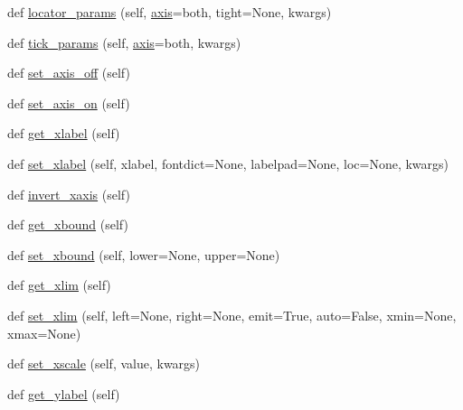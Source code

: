 \begin{DoxyCompactItemize}
\item 
def \hyperlink{classmatplotlib_1_1axes_1_1__base_1_1__AxesBase_ad216bc73e69844202f6ccb94dcd396c4}{locator\+\_\+params} (self, \hyperlink{classmatplotlib_1_1axes_1_1__base_1_1__AxesBase_a9c63db539d7ab6bcb071919bdfd8af8f}{axis}=\textquotesingle{}both\textquotesingle{}, tight=None, kwargs)
\item 
def \hyperlink{classmatplotlib_1_1axes_1_1__base_1_1__AxesBase_abd388619c905b1f2f74c361314de4480}{tick\+\_\+params} (self, \hyperlink{classmatplotlib_1_1axes_1_1__base_1_1__AxesBase_a9c63db539d7ab6bcb071919bdfd8af8f}{axis}=\textquotesingle{}both\textquotesingle{}, kwargs)
\item 
def \hyperlink{classmatplotlib_1_1axes_1_1__base_1_1__AxesBase_a081cde5870b8398fce8f85a81ebc1957}{set\+\_\+axis\+\_\+off} (self)
\item 
def \hyperlink{classmatplotlib_1_1axes_1_1__base_1_1__AxesBase_a11e763320558acf5cbbb8ba96d118df5}{set\+\_\+axis\+\_\+on} (self)
\item 
def \hyperlink{classmatplotlib_1_1axes_1_1__base_1_1__AxesBase_a11ec08f4243947683148112020aa755b}{get\+\_\+xlabel} (self)
\item 
def \hyperlink{classmatplotlib_1_1axes_1_1__base_1_1__AxesBase_ad8536294adfb9b0319ea6245cae56777}{set\+\_\+xlabel} (self, xlabel, fontdict=None, labelpad=None, loc=None, kwargs)
\item 
def \hyperlink{classmatplotlib_1_1axes_1_1__base_1_1__AxesBase_a89ad257422c8025445e6289a5a2caa84}{invert\+\_\+xaxis} (self)
\item 
def \hyperlink{classmatplotlib_1_1axes_1_1__base_1_1__AxesBase_ae663b3092f62003d80a3f852b86fd853}{get\+\_\+xbound} (self)
\item 
def \hyperlink{classmatplotlib_1_1axes_1_1__base_1_1__AxesBase_ab95ea6eb5d87d4662c1fec40a396f08d}{set\+\_\+xbound} (self, lower=None, upper=None)
\item 
def \hyperlink{classmatplotlib_1_1axes_1_1__base_1_1__AxesBase_a6b2af971d2b20a36ac27b7efb5d582ca}{get\+\_\+xlim} (self)
\item 
def \hyperlink{classmatplotlib_1_1axes_1_1__base_1_1__AxesBase_a99a2478a357038988eb69918eddceda5}{set\+\_\+xlim} (self, left=None, right=None, emit=True, auto=False, xmin=None, xmax=None)
\item 
def \hyperlink{classmatplotlib_1_1axes_1_1__base_1_1__AxesBase_a9f16b52c694472174cbae516b78bc1c7}{set\+\_\+xscale} (self, value, kwargs)
\item 
def \hyperlink{classmatplotlib_1_1axes_1_1__base_1_1__AxesBase_a605e28fbce70913222a288b7f33cad99}{get\+\_\+ylabel} (self)

\end{DoxyCompactItemize}
